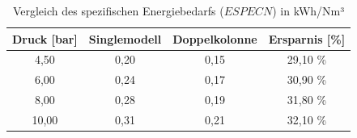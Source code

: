 \begin{table}[htbp]
\centering
\caption{Vergleich des spezifischen Energiebedarfs ($ESPECN$) in kWh/Nm³}
\label{tab:vergleich_power_penalty}
\begin{tabular}{cccc}
\hline
\textbf{Druck [bar]} & \textbf{Singlemodell} & \textbf{Doppelkolonne} & \textbf{Ersparnis [\%]} \\ \hline
4,50 & 0,20 & 0,15 & 29,10 \% \\
6,00 & 0,24 & 0,17 & 30,90 \% \\
8,00 & 0,28 & 0,19 & 31,80 \% \\
10,00 & 0,31 & 0,21 & 32,10 \%  \hline
\end{tabular}
\end{table}
